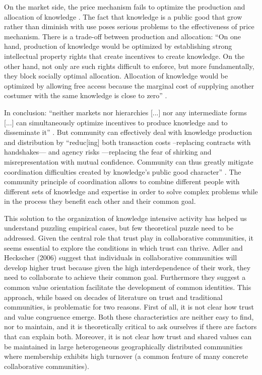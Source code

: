On the market side, the price mechanism fails to optimize the production and allocation of knowledge \citep{arrow:1962,stiglitz:1996}. The fact that knowledge is a public good that grow rather than diminish with use poses serious problems to the effectiveness of price mechanism. There is a trade-off between production and allocation: ``On one hand, production of knowledge would be optimized by establishing strong intellectual property rights that create incentives to create knowledge. On the other hand, not only are such rights difficult to enforce, but more fundamentally, they block socially optimal allocation. Allocation of knowledge would be optimized by allowing free access because the marginal cost of supplying another costumer with the same knowledge is close to zero'' \citep[217]{adler:2001}.

In conclusion: ``neither markets nor hierarchies [...] nor any intermediate forms [...] can simultaneously optimize incentives to produce knowledge and to disseminate it'' \citep[29]{adler:2006}. But community can effectively deal with knowledge production and distribution by ``reduc[ing] both transaction costs --replacing contracts with handshakes--- and agency risks ---replacing the fear of shirking and misrepresentation with mutual confidence. Community can thus greatly mitigate coordination difficulties created by knowledge's public good character'' \citep[30]{adler:2006}. The community principle of coordination allows to combine different people with different sets of knowledge and expertise in order to solve complex problems while in the process they benefit each other and their common goal.

This solution to the organization of knowledge intensive activity has helped us understand puzzling empirical cases, but few theoretical puzzle need to be addressed. Given the central role that trust play in collaborative communities, it seems essential to explore the conditions in which trust can thrive. Adler and Heckscher (2006) suggest that individuals in collaborative communities will develop higher trust because given the high interdependence of their work, they need to collaborate to achieve their common goal.  Furthermore they suggest a common value orientation facilitate the development of common identities. This approach, while based on decades of literature on trust and traditional communities, is problematic for two reasons. First of all, it is not clear how trust and value congruence emerge. Both these characteristics are neither easy to find, nor to maintain, and it is theoretically critical to ask ourselves if there are factors that can explain both. Moreover, it is not clear how trust and shared values can be maintained in large heterogeneous geographically distributed communities where membership exhibits high turnover (a common feature of many concrete collaborative communities). 

